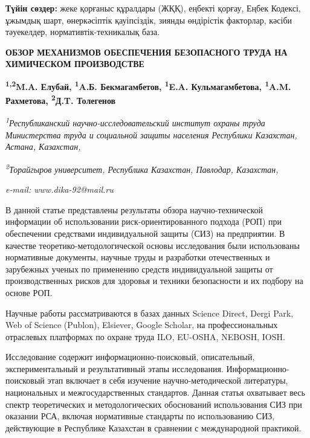 {\bfseries Түйін сөздер:} жеке қорғаныс құралдары (ЖҚҚ), еңбекті қорғау,
Еңбек Кодексі, ұжымдық шарт, өнеркәсіптік қауіпсіздік, зиянды өндірістік
факторлар, кәсіби тәуекелдер, нормативтік-техникалық база.

\begin{articleheader}
{\bfseries ОБЗОР МЕХАНИЗМОВ ОБЕСПЕЧЕНИЯ БЕЗОПАСНОГО ТРУДА НА ХИМИЧЕСКОМ ПРОИЗВОДСТВЕ}

{\bfseries
\textsuperscript{1,2}M.A. Елубай,
\textsuperscript{1}A.Б. Бекмагамбетов,
\textsuperscript{1}E.A. Кульмагамбетова,
\textsuperscript{1}A.M. Рахметова,
\textsuperscript{2}Д.T. Толегенов\textsuperscript{\envelope }}
\end{articleheader}

\begin{affiliation}
\emph{\textsuperscript{1}Республиканский научно-исследовательский
институт охраны труда Министерства труда и социальной защиты населения
Республики Казахстан, Астана, Казахстан,}

\emph{\textsuperscript{2}Торайгыров университет, Республика Казахстан, Павлодар, Казахстан,}

\emph{e-mail: www.dika-92@mail.ru}
\end{affiliation}

В данной статье представлены результаты обзора научно-технической
информации об использовании риск-ориентированного подхода (РОП) при
обеспечении средствами индивидуальной защиты (СИЗ) на предприятии. В
качестве теоретико-методологической основы исследования были
использованы нормативные документы, научные труды и разработки
отечественных и зарубежных ученых по применению средств индивидуальной
защиты от производственных рисков для здоровья и техники безопасности и
их подбору на основе РОП.

Научные работы рассматриваются в базах данных Science Direct, Dergi
Park, Web of Science (Publon), Elsiever, Google Scholar, на
профессиональных отраслевых платформах по охране труда ILO, EU-OSHA,
NEBOSH, IOSH.

Исследование содержит информационно-поисковый, описательный,
экспериментальный и результативный этапы исследования.
Информационно-поисковый этап включает в себя изучение
научно-методической литературы, национальных и межгосударственных
стандартов. Данная статья охватывает весь спектр теоретических и
методологических обоснований использования СИЗ при оказании РСА, включая
нормативные стандарты по использованию СИЗ, действующие в Республике
Казахстан в сравнении с международной практикой.

